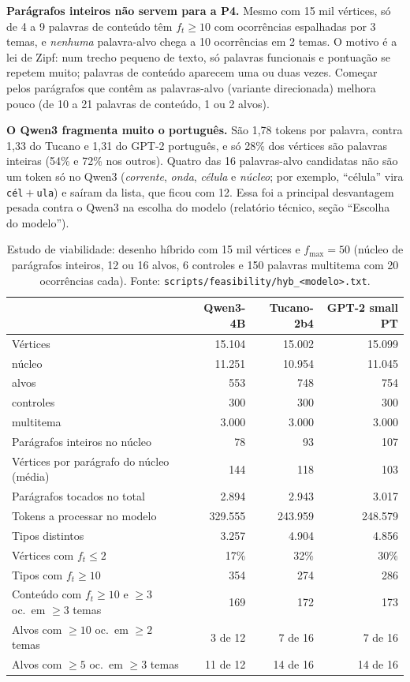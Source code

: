 \documentclass[11pt,a4paper]{article}
\newcommand{\tok}[1]{\texttt{#1}}              %
\newcommand{\esp}{\textvisiblespace}           %
\newcommand{\cod}[1]{\texttt{#1}}              %
\begin{document}
\textbf{Parágrafos inteiros não servem para a P4.} Mesmo com 15 mil vértices, só de 4 a 9
palavras de conteúdo têm $f_t\ge10$ com ocorrências espalhadas por 3 temas, e \emph{nenhuma}
palavra-alvo chega a 10 ocorrências em 2 temas. O motivo é a lei de Zipf: num trecho pequeno de
texto, só palavras funcionais e pontuação se repetem muito; palavras de conteúdo aparecem uma
ou duas vezes. Começar pelos parágrafos que contêm as palavras-alvo (variante direcionada)
melhora pouco (de 10 a 21 palavras de conteúdo, 1 ou 2 alvos).

\textbf{O Qwen3 fragmenta muito o português.} São 1,78 tokens por palavra, contra 1,33 do
Tucano e 1,31 do GPT-2 português, e só 28\% dos vértices são palavras inteiras (54\% e 72\% nos
outros). Quatro das 16 palavras-alvo candidatas não são um token só no Qwen3 (\emph{corrente},
\emph{onda}, \emph{célula} e \emph{núcleo}; por exemplo, ``\esp célula'' vira
\tok{\esp cél}${}+{}$\tok{ula}) e saíram da lista, que ficou com 12. Essa foi a principal
desvantagem pesada contra o Qwen3 na escolha do modelo (relatório técnico, seção ``Escolha do modelo'').

\begin{table}[htbp]
\centering
\caption{Estudo de viabilidade: desenho híbrido com 15 mil vértices e $f_{\max}=50$
(núcleo de parágrafos inteiros, 12 ou 16 alvos, 6 controles e 150 palavras multitema com 20
ocorrências cada). Fonte: \cod{scripts/feasibility/hyb\_<modelo>.txt}.}\label{tab:viab-hibrido}
\small
\begin{tabular}{@{}l r r r@{}}
\toprule
& \textbf{Qwen3-4B} & \textbf{Tucano-2b4} & \textbf{GPT-2 small PT} \\
\midrule
Vértices & 15.104 & 15.002 & 15.099 \\
\quad núcleo & 11.251 & 10.954 & 11.045 \\
\quad alvos & 553 & 748 & 754 \\
\quad controles & 300 & 300 & 300 \\
\quad multitema & 3.000 & 3.000 & 3.000 \\
Parágrafos inteiros no núcleo & 78 & 93 & 107 \\
Vértices por parágrafo do núcleo (média) & 144 & 118 & 103 \\
Parágrafos tocados no total & 2.894 & 2.943 & 3.017 \\
Tokens a processar no modelo & 329.555 & 243.959 & 248.579 \\
Tipos distintos & 3.257 & 4.904 & 4.856 \\
Vértices com $f_t\le2$ & 17\% & 32\% & 30\% \\
Tipos com $f_t\ge10$ & 354 & 274 & 286 \\
Conteúdo com $f_t\ge10$ e $\ge3$ oc.\ em $\ge3$ temas & 169 & 172 & 173 \\
Alvos com $\ge10$ oc.\ em $\ge2$ temas & 3 de 12 & 7 de 16 & 7 de 16 \\
Alvos com $\ge5$ oc.\ em $\ge3$ temas & 11 de 12 & 14 de 16 & 14 de 16 \\
\bottomrule
\end{tabular}
\end{table}
\end{document}
